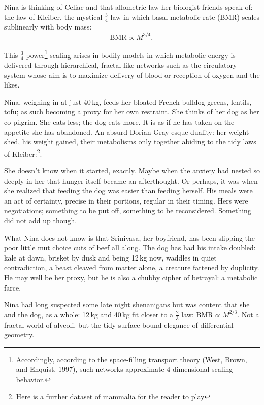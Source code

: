 Nina is thinking of Celiac and that allometric law her biologist friends speak of: the law of Kleiber, the mystical \( \tfrac{3}{4} \) law in which  basal metabolic rate (BMR) scales sublinearly with body mass:
\[
\text{BMR} \propto M^{3/4},
\]

This \(\tfrac{3}{4}\) power\footnote{Accordingly, according to the space-filling transport theory (West, Brown, and Enquist, 1997), such networks approximate 4-dimensional scaling behavior.} scaling arises in bodily models in which metabolic energy is delivered through hierarchical, fractal-like networks such as the circulatory system whose aim is to maximize delivery of blood or reception of oxygen and the likes.

\smallskip

Nina, weighing in at just 40\,kg, feeds her bloated French bulldog greens, lentils, tofu; as such becoming a proxy for her own restraint. She thinks of her dog as her co-pilgrim. She eats less; the dog eats more. It is as if he has taken on the appetite she has abandoned. An absurd Dorian Gray-esque duality: her weight shed, his weight gained, their metabolisms only together abiding to the tidy laws of \href{https://colab.research.google.com/drive/1xxmtmJSuziXUUPYG60LAZeY_pc6_tkZ9?usp=sharing}{Kleiber}:\footnote{Here is a further dataset of \href{https://animaldiversity.ummz.umich.edu/quaardvark/search/}{mammalia} for the reader to play}.

\smallskip

She doesn’t know when it started, exactly. Maybe when the anxiety had nested so deeply in her that hunger itself became an afterthought. Or perhaps, it was when she realized that feeding the dog was easier than feeding herself. His meals were an act of certainty, precise in their portions, regular in their timing. Hers were negotiations; something to be put off, something to be reconsidered. Something did not add up though.

\smallskip

What Nina does not know is that Srinivasa, her boyfriend, has been slipping the poor little mut choice cuts of beef all along. The dog has had his intake doubled: kale at dawn, brisket by dusk and being 12\,kg now, waddles in quiet contradiction, a beast cleaved from matter alone, a creature fattened by duplicity. He may well be her proxy, but he is also a chubby cipher of betrayal: a metabolic farce.

\smallskip

Nina had long suspected some late night shenanigans but was content that she and the dog, as a whole: 12\,kg and 40\,kg fit closer to a \( \tfrac{2}{3} \) law: \(
\text{BMR} \propto M^{2/3}.
\) Not a fractal world of alveoli, but the tidy surface-bound elegance of differential geometry.

